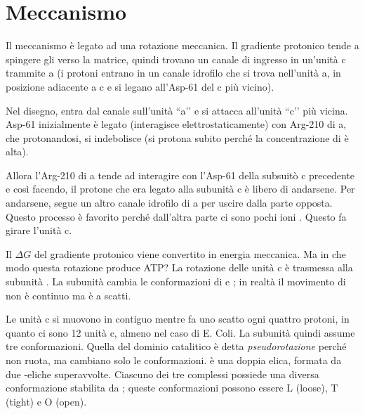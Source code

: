 \clearpage

\section{Meccanismo}


Il meccanismo è legato ad una rotazione meccanica. Il gradiente protonico tende a spingere gli  verso la matrice, quindi trovano un canale di ingresso in un'unità c trammite a (i protoni entrano in un canale idrofilo che si trova nell'unità a, in posizione adiacente a c e si legano all'Asp-61 del c più vicino).

Nel disegno,  entra dal canale sull’unità ``a’’ e si attacca all’unità ``c’’ più vicina. Asp-61 inizialmente è legato (interagisce elettrostaticamente) con Arg-210 di a, che  protonandosi, si indebolisce (si protona subito perché la concentrazione di  è alta).

Allora l'Arg-210 di a tende ad interagire con l'Asp-61 della subsuitò c precedente e così facendo, il protone che era legato alla subunità c è libero di andarsene. Per andarsene, segue un altro canale idrofilo di a per uscire dalla parte opposta. Questo processo è favorito perché dall'altra parte ci sono pochi ioni . Questo fa girare l'unità c.

Il $\Delta G$ del gradiente protonico viene convertito in energia meccanica. Ma in che modo questa rotazione produce ATP? La rotazione delle unità c è trasmessa alla subunità \gamma. La subunità \gamma{} cambia le conformazioni di \alpha{} e \beta{}; in realtà il movimento di \gamma{} non è continuo ma è a scatti.

Le unità c si muovono in contiguo mentre \gamma{} fa uno scatto ogni quattro protoni, in quanto ci sono 12 unità c, almeno nel caso di E. Coli. La subunità \gamma{} quindi assume tre conformazioni.
Quella del dominio catalitico è detta \emph{pseudorotazione} perché non ruota, ma cambiano solo le conformazioni.{}
\gamma{} è una doppia elica, formata da due \alpha-eliche superavvolte.{}
Ciascuno dei tre complessi \alpha\beta{} possiede una diversa conformazione stabilita da \gamma; queste conformazioni possono essere L (loose), T (tight) e O (open).


